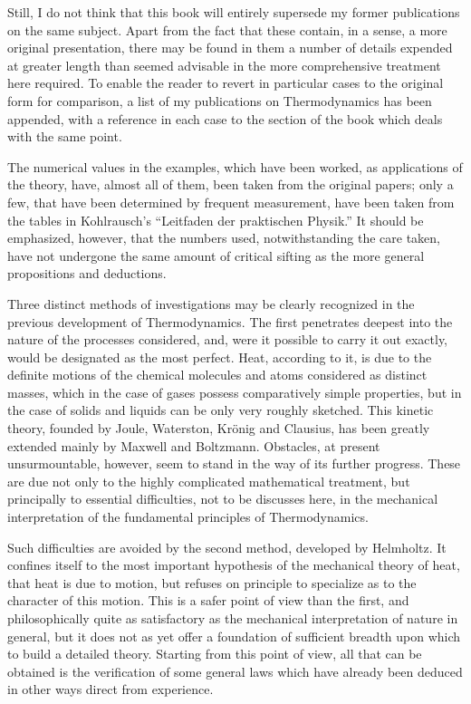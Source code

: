 \documentclass[oneside,12pt]{book}
\begin{document}
Still, I do not think that this book will entirely supersede my former publications on the same subject. Apart from the fact that these contain, in a sense, a more original presentation, there may be found in them a number of details expended at greater length than seemed advisable in the more comprehensive treatment here required. To enable the reader to revert in particular cases to the original form for comparison, a list of my publications on Thermodynamics has been appended, with a reference in each case to the section of the book which deals with the same point. \par

The numerical values in the examples, which have been worked, as applications of the theory, have, almost all of them, been taken from the original papers; only a few, that have been determined by frequent measurement, have been taken from the tables in Kohlrausch's ``Leitfaden der praktischen Physik.'' It should be emphasized, however, that the numbers used, notwithstanding the care taken, have not undergone the same amount of critical sifting as the more general propositions and deductions. \par

Three distinct methods of investigations may be clearly recognized in the previous development of Thermodynamics. The first penetrates deepest into the nature of the processes considered, and, were it possible to carry it out exactly, would be designated as the most perfect. Heat, according to it, is due to the definite motions of the chemical molecules and atoms considered as distinct masses, which in the case of gases possess comparatively simple properties, but in the case of solids and liquids can be only very roughly sketched. This kinetic theory, founded by Joule, Waterston, Kr\"onig and Clausius, has been greatly extended mainly by Maxwell and Boltzmann. Obstacles, at present unsurmountable, however, seem to stand in the way of its further progress. These are due not only to the highly complicated mathematical treatment, but principally to essential difficulties, not to be discusses here, in the mechanical interpretation of the fundamental principles of Thermodynamics. \par

Such difficulties are avoided by the second method, developed by Helmholtz. It confines itself to the most important hypothesis of the mechanical theory of heat, that heat is due to motion, but refuses on principle to specialize as to the character of this motion. This is a safer point of view than the first, and philosophically quite as satisfactory as the mechanical interpretation of nature in general, but it does not as yet offer a foundation of sufficient breadth upon which to build a detailed theory. Starting from this point of view, all that can be obtained is the verification of some general laws which have already been deduced in other ways direct from experience. \par
\end{document}
